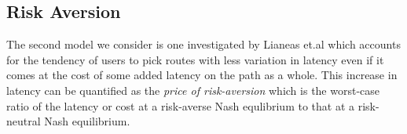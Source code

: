 \subsection{Risk Aversion}
The second model we consider is one investigated by Lianeas et.al \cite{risk-averse} which accounts for the
tendency of users to pick routes with less variation in latency even if it comes at the cost of some added
latency on the path as a whole. This increase in latency can be quantified as the {\em{price of risk-aversion}}
which is the worst-case ratio of the latency or cost at a risk-averse Nash equlibrium to that at a risk-neutral
Nash equilibrium. 


